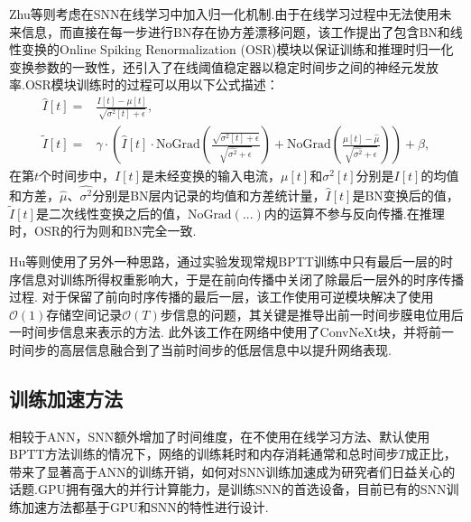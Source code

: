 \documentclass{SCIS2020cn}
\begin{document}
Zhu等\cite{zhu2024online}则考虑在SNN在线学习中加入归一化机制.由于在线学习过程中无法使用未来信息，而直接在每一步进行BN存在协方差漂移问题，该工作提出了包含BN和线性变换的Online Spiking Renormalization (OSR)模块以保证训练和推理时归一化变换参数的一致性，还引入了在线阈值稳定器以稳定时间步之间的神经元发放率.OSR模块训练时的过程可以用以下公式描述：
\begin{align}
    {\hat{I}}[t] =& \frac{ I[t] - \mu[t]}{\sqrt{\sigma^2[t] + \epsilon}}, \label{eq_OSR_1} \\
    {\tilde{I}}[t] =& \gamma \cdot \left( {\hat{I}}[t] \cdot \text{NoGrad}\left( \frac{\sqrt{\sigma^2[t] + \epsilon}}{\sqrt{\hat{\sigma^2} + \epsilon}} \right) + \text{NoGrad} \left( \frac{\mu[t] - \hat{\mu}}{\sqrt{\hat{\sigma^2} + \epsilon}} \right) \right) + \beta, \label{eq_OSR_2}
\end{align}
在第$t$个时间步中，$ I[t]$是未经变换的输入电流，$\mu[t]$和$\sigma^2[t]$分别是$ I[t]$的均值和方差，$\hat{\mu}$、$\hat{\sigma^2}$分别是BN层内记录的均值和方差统计量，$\hat{I}[t]$是BN变换后的值，$\tilde{I}[t]$是二次线性变换之后的值，$\text{NoGrad}(...)$内的运算不参与反向传播.在推理时，OSR的行为则和BN完全一致.

Hu等\cite{hu2024highperformance}则使用了另外一种思路，通过实验发现常规BPTT训练中只有最后一层的时序信息对训练所得权重影响大，于是在前向传播中关闭了除最后一层外的时序传播过程.
对于保留了前向时序传播的最后一层，该工作使用可逆模块解决了使用$\mathcal{O}(1)$存储空间记录$\mathcal{O}(T)$步信息的问题，其关键是推导出前一时间步膜电位用后一时间步信息来表示的方法.
此外该工作在网络中使用了ConvNeXt块\cite{liu2022convnet}，并将前一时间步的高层信息融合到了当前时间步的低层信息中以提升网络表现.


\subsection{训练加速方法}
相较于ANN，SNN额外增加了时间维度，在不使用在线学习方法、默认使用BPTT方法训练的情况下，网络的训练耗时和内存消耗通常和总时间步$T$成正比，带来了显著高于ANN的训练开销，如何对SNN训练加速成为研究者们日益关心的话题.GPU拥有强大的并行计算能力，是训练SNN的首选设备，目前已有的SNN训练加速方法都基于GPU和SNN的特性进行设计.
\end{document}
